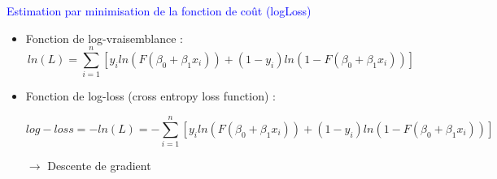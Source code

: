 \documentclass[12pt,aspectratio=1610]{beamer}
\begin{document}
\begin{frame}
	
	\textcolor{blue}{Estimation par minimisation de la fonction de coût (logLoss)}
	\begin{itemize}
		
			
		\item   
		Fonction de log-vraisemblance :   
		$$ln(L)=\sum_{i=1}^{n}\left[y_iln\left(F(\beta_0+\beta_1x_i)\right)+(1-y_i)ln\left(1- F(\beta_0+\beta_1x_i)  \right) \right]$$ 
		
		
		\pause
		
		\item  Fonction de log-loss (cross entropy loss function) :   
		
			$$	log-loss=-ln(L)=-\sum_{i=1}^{n}\left[y_iln\left(F(\beta_0+\beta_1x_i)\right)+(1-y_i)ln\left(1- F(\beta_0+\beta_1x_i)  \right) \right]$$ 
			
		$\rightarrow$ Descente de gradient
		
		
	
	\end{itemize}
\end{frame}
\end{document}
